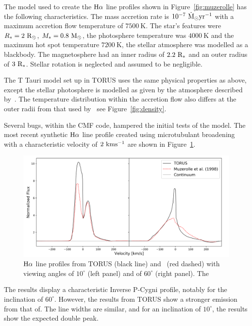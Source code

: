 \documentclass[fleqn,usenatbib]{mnras}
\begin{document}
The model used to create the ${\rm H}\alpha$ line profiles shown in Figure~\ref{fig:muzerolle} has the following characteristics. The mass accretion rate is $10^{-7} ~{\rm \dot{M}_{\odot}yr^{-1}}$ with a maximum accretion flow temperature of $7500~\textrm{K}$. The star's features were $R_{\ast}=2~{\rm R_{\odot}}$, $M_{\ast}=0.8~{\rm M_{\odot}}$, the photosphere temperature was $4000~\textrm{K}$ and the maximum hot spot temperature $7200~\textrm{K}$, the stellar atmosphere was modelled as a blackbody. The magnetosphere had an inner radius of $2.2~{\rm R_{\ast}}$ and an outer radius of $3~{\rm R_{\ast}}$. Stellar rotation is neglected and assumed to be negligible.

The T Tauri model set up in TORUS uses the same physical properties as above, except the stellar photosphere is modelled as given by the atmosphere described by~\citet{1979ApJS...40....1K}. The temperature distribution within the accretion flow also differs at the outer radii from that used by~\citet{1998ApJ...492..743M} see Figure~\ref{fig:density}.

Several bugs, within the CMF code, hampered the initial tests of the model. The most recent synthetic ${\rm H}\alpha$ line profile created using microtubulant broadening with a characteristic velocity of $2~{\rm kms^{-1}}$ are shown in Figure~\ref{fig:bestline}.

\begin{figure}
    \centering
    \includegraphics[width=\linewidth]{figures/results}
    \caption{${\rm H}\alpha$ line profiles from TORUS (black line) and~\citep{1998ApJ...492..743M} (red dashed) with viewing angles of $10^{\circ}$ (left panel) and of $60^{\circ}$ (right panel). The}
    \label{fig:bestline}
\end{figure}

The results display a characteristic Inverse P-Cygni profile, notably for the inclination of $60^{\circ}$. However, the results from TORUS show a stronger emission from that of\citep{1998ApJ...492..743M}. The line widths are similar, and for an inclination of $10^{\circ}$, the results show the expected double peak.
\end{document}
